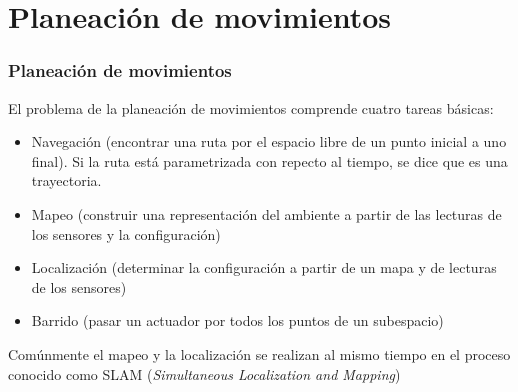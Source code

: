 \section[P. de movimientos]{Planeación de movimientos}

\begin{frame}\frametitle{Planeación de movimientos}
  El problema de la planeación de movimientos comprende cuatro tareas básicas:
  \begin{itemize}
  \item Navegación (encontrar una ruta por el espacio libre de un punto inicial a uno final). Si la ruta está parametrizada con repecto al tiempo, se dice que es una trayectoria.
  \item Mapeo (construir una representación del ambiente a partir de las lecturas de los sensores y la configuración)
  \item Localización (determinar la configuración a partir de un mapa y de lecturas de los sensores)
  \item Barrido (pasar un actuador por todos los puntos de un subespacio)
  \end{itemize}
  Comúnmente el mapeo y la localización se realizan al mismo tiempo en el proceso conocido como SLAM (\textit{Simultaneous Localization and Mapping})
\end{frame}

